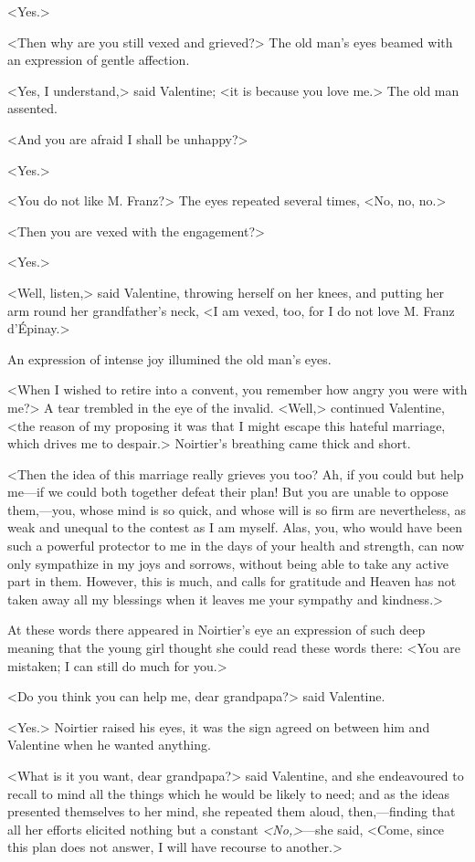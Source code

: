  <Yes.> 

 <Then why are you still vexed and grieved?> The old man's eyes beamed with an expression of gentle affection. 

 <Yes, I understand,> said Valentine; <it is because you love me.> The old man assented. 

 <And you are afraid I shall be unhappy?> 

 <Yes.> 

 <You do not like M. Franz?> The eyes repeated several times, <No, no, no.> 

 <Then you are vexed with the engagement?> 

 <Yes.> 

 <Well, listen,> said Valentine, throwing herself on her knees, and putting her arm round her grandfather's neck, <I am vexed, too, for I do not love M. Franz d'Épinay.> 

 An expression of intense joy illumined the old man's eyes. 

 <When I wished to retire into a convent, you remember how angry you were with me?> A tear trembled in the eye of the invalid. <Well,> continued Valentine, <the reason of my proposing it was that I might escape this hateful marriage, which drives me to despair.> Noirtier's breathing came thick and short. 

 <Then the idea of this marriage really grieves you too? Ah, if you could but help me—if we could both together defeat their plan! But you are unable to oppose them,—you, whose mind is so quick, and whose will is so firm are nevertheless, as weak and unequal to the contest as I am myself. Alas, you, who would have been such a powerful protector to me in the days of your health and strength, can now only sympathize in my joys and sorrows, without being able to take any active part in them. However, this is much, and calls for gratitude and Heaven has not taken away all my blessings when it leaves me your sympathy and kindness.> 

 At these words there appeared in Noirtier's eye an expression of such deep meaning that the young girl thought she could read these words there: <You are mistaken; I can still do much for you.> 

 <Do you think you can help me, dear grandpapa?> said Valentine. 

 <Yes.> Noirtier raised his eyes, it was the sign agreed on between him and Valentine when he wanted anything. 

 <What is it you want, dear grandpapa?> said Valentine, and she endeavoured to recall to mind all the things which he would be likely to need; and as the ideas presented themselves to her mind, she repeated them aloud, then,—finding that all her efforts elicited nothing but a constant \textit{<No,>}—she said, <Come, since this plan does not answer, I will have recourse to another.> 

